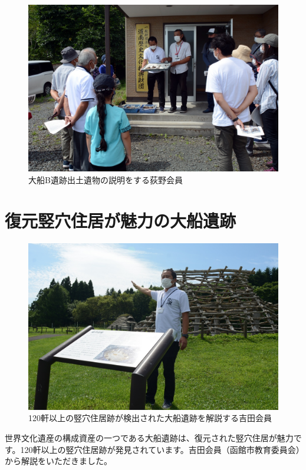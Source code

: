 \documentclass[a4j,11pt,twocolumn,openany]{jsbook}
\begin{document}
\begin{figure}[ht]
	\centering
	\includegraphics[width=\linewidth]{fig/01_Iseki_kengaku/01_Opening.JPG}
	\caption{大船B遺跡出土遺物の説明をする荻野会員}
	\label{}
\end{figure}

\section{復元竪穴住居が魅力の大船遺跡}

\begin{figure}[ht]
	\centering
	\includegraphics[width=\linewidth]{fig/01_Iseki_kengaku/02_Ofune.JPG}
	\caption{120軒以上の竪穴住居跡が検出された大船遺跡を解説する吉田会員}
	\label{}
\end{figure}

世界文化遺産の構成資産の一つである大船遺跡は、復元された竪穴住居が魅力です。120軒以上の竪穴住居跡が発見されています。吉田会員（函館市教育委員会）から解説をいただきました。
\end{document}
